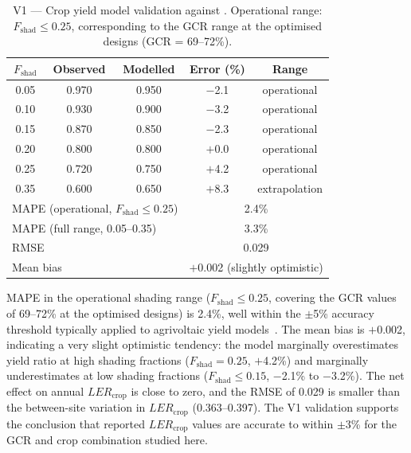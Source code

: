 \begin{table}[H]
	\caption{V1 --- Crop yield model validation against
		\citet{mohammedi2023}. Operational range: $F_{\text{shad}} \leq 0.25$,
		corresponding to the GCR range at the optimised designs
		(GCR = 69--72\%).}
	\label{tab:v1}
	\centering
	\begin{tabular}{ccccc}
		\toprule
		$F_{\text{shad}}$ & Observed & Modelled & Error (\%) & Range \\
		\midrule
		0.05 & 0.970 & 0.950 & $-$2.1 & operational \\
		0.10 & 0.930 & 0.900 & $-$3.2 & operational \\
		0.15 & 0.870 & 0.850 & $-$2.3 & operational \\
		0.20 & 0.800 & 0.800 & $+$0.0 & operational \\
		0.25 & 0.720 & 0.750 & $+$4.2 & operational \\
		0.35 & 0.600 & 0.650 & $+$8.3 & extrapolation \\
		\midrule
		\multicolumn{3}{l}{MAPE (operational, $F_{\text{shad}} \leq 0.25$)}
		& \multicolumn{2}{c}{2.4\%} \\
		\multicolumn{3}{l}{MAPE (full range, 0.05--0.35)}
		& \multicolumn{2}{c}{3.3\%} \\
		\multicolumn{3}{l}{RMSE}
		& \multicolumn{2}{c}{0.029} \\
		\multicolumn{3}{l}{Mean bias}
		& \multicolumn{2}{c}{$+$0.002 (slightly optimistic)} \\
		\bottomrule
	\end{tabular}
\end{table}

MAPE in the operational shading range ($F_{\text{shad}} \leq 0.25$,
covering the GCR values of 69--72\% at the optimised designs) is
2.4\%, well within the $\pm$5\% accuracy threshold typically
applied to agrivoltaic yield models~\citep{mazzeo2025}. The mean
bias is $+$0.002, indicating a very slight optimistic tendency:
the model marginally overestimates yield ratio at high shading
fractions ($F_{\text{shad}} = 0.25$, $+$4.2\%) and marginally
underestimates at low shading fractions ($F_{\text{shad}} \leq 0.15$,
$-$2.1\% to $-$3.2\%). The net effect on annual $LER_{\text{crop}}$
is close to zero, and the RMSE of 0.029 is smaller than the
between-site variation in $LER_{\text{crop}}$ (0.363--0.397).
The V1 validation supports the conclusion that reported
$LER_{\text{crop}}$ values are accurate to within $\pm$3\% for
the GCR and crop combination studied here.

